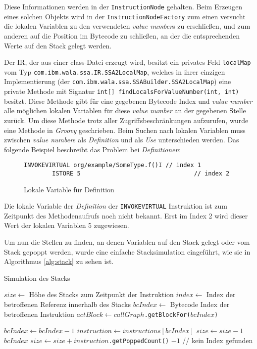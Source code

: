 Diese Informationen werden in der \texttt{InstructionNode} gehalten. Beim Erzeugen 
eines solchen Objekts wird in der \texttt{InstructionNodeFactory} zum einen versucht
die lokalen Variablen zu den verwendeten \textit{value number}s zu erschließen, und zum anderen auf die  
Position im Bytecode zu schließen, an der die entsprechenden Werte auf den Stack gelegt 
werden.

Der IR, der aus einer class-Datei erzeugt wird, besitzt ein privates Feld \texttt{localMap}
vom Typ \texttt{com.ibm.wala.ssa.IR.SSA2LocalMap}, welches in ihrer einzigen Implementierung
(der \texttt{com.ibm.wala.ssa.SSABuilder.SSA2LocalMap}) eine private Methode mit 
Signatur \texttt{int[] findLocalsForValueNumber(int, int)} besitzt. Diese Methode gibt für eine gegebenen 
Bytecode Index und \textit{value number} alle möglichen lokalen Variablen für diese \textit{value number} 
an der gegebenen Stelle zurück. Um diese Methode trotz aller Zugriffsbeschränkungen 
aufzurufen, wurde eine Methode in \textit{Groovy} geschrieben. Beim Suchen nach lokalen 
Variablen muss zwischen \textit{value number}s als \textit{Definition} 
und als \textit{Use} unterschieden werden. Das folgende Beispiel beschreibt das Problem bei 
\textit{Definitionen}:

\begin{figure}[H]
	\begin{lstlisting}[language=Bytecode]
		INVOKEVIRTUAL org/example/SomeType.f()I // index 1
		ISTORE 5								// index 2
	\end{lstlisting}
	\caption{Lokale Variable für Definition}
\end{figure}

Die lokale Variable der \textit{Definition} der \texttt{INVOKEVIRTUAL} Instruktion ist zum
Zeitpunkt des Methodenaufrufs noch nicht bekannt. Erst im Index 2 wird dieser Wert der 
lokalen Variablen 5 zugewiesen.

Um nun die Stellen zu finden, an denen Variablen auf den Stack gelegt oder vom Stack 
gepoppt werden, wurde eine einfache Stacksimulation eingeführt, wie sie in Algorithmus
\ref{alg:stack} zu sehen ist.

\begin{algorithm}[H]
	\caption{Simulation des Stacks}\label{alg:stack}
	\begin{algorithmic}[1]
		\STATE $size \gets$ Höhe des Stacks zum Zeitpunkt der Instruktion 
		\STATE $index \gets$ Index der betroffenen Referenz innerhalb des Stacks
		\STATE $bcIndex \gets$ Bytecode Index der betroffenen Instruktion
			\STATE \texttt{$actBlock \gets callGraph$.getBlockFor($bcIndex$)}

				\STATE $bcIndex \gets bcIndex - 1$
				\STATE $instruction \gets instructions[bcIndex]$
					\STATE $size \gets size - 1$
						\RETURN $bcIndex$ 
					\ENDIF
				\ENDIF
				\STATE \texttt{$size \gets size + instruction$.getPoppedCount()}
			\ENDWHILE	
		\ENDWHILE
		\RETURN $-1$ // kein Index gefunden
	\end{algorithmic}
\end{algorithm}


